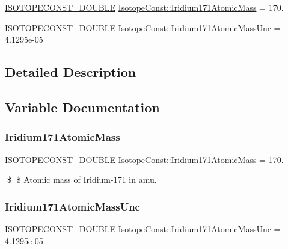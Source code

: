 \begin{DoxyCompactItemize}
\item 
\mbox{\hyperlink{group___isotope_const-_macros_ga8f45a7272ce02c0b4c65c44636ed719a}{I\+S\+O\+T\+O\+P\+E\+C\+O\+N\+S\+T\+\_\+\+D\+O\+U\+B\+LE}} \mbox{\hyperlink{group___isotope_const-_iridium-_ir171_ga6f3bc01a5c0d477dadae2682614b3708}{Isotope\+Const\+::\+Iridium171\+Atomic\+Mass}} = 170.
\item 
\mbox{\hyperlink{group___isotope_const-_macros_ga8f45a7272ce02c0b4c65c44636ed719a}{I\+S\+O\+T\+O\+P\+E\+C\+O\+N\+S\+T\+\_\+\+D\+O\+U\+B\+LE}} \mbox{\hyperlink{group___isotope_const-_iridium-_ir171_ga77c2593c188c1960186c204812b14785}{Isotope\+Const\+::\+Iridium171\+Atomic\+Mass\+Unc}} = 4.\+1295e-\/05
\end{DoxyCompactItemize}


\subsection{Detailed Description}


\subsection{Variable Documentation}
\mbox{\label{group___isotope_const-_iridium-_ir171_ga6f3bc01a5c0d477dadae2682614b3708}} 
\subsubsection{\texorpdfstring{Iridium171\+Atomic\+Mass}{Iridium171AtomicMass}}
{\footnotesize\ttfamily \mbox{\hyperlink{group___isotope_const-_macros_ga8f45a7272ce02c0b4c65c44636ed719a}{I\+S\+O\+T\+O\+P\+E\+C\+O\+N\+S\+T\+\_\+\+D\+O\+U\+B\+LE}} Isotope\+Const\+::\+Iridium171\+Atomic\+Mass = 170.}

\$ \$ Atomic mass of Iridium-\/171 in amu. \mbox{\label{group___isotope_const-_iridium-_ir171_ga77c2593c188c1960186c204812b14785}} 
\subsubsection{\texorpdfstring{Iridium171\+Atomic\+Mass\+Unc}{Iridium171AtomicMassUnc}}
{\footnotesize\ttfamily \mbox{\hyperlink{group___isotope_const-_macros_ga8f45a7272ce02c0b4c65c44636ed719a}{I\+S\+O\+T\+O\+P\+E\+C\+O\+N\+S\+T\+\_\+\+D\+O\+U\+B\+LE}} Isotope\+Const\+::\+Iridium171\+Atomic\+Mass\+Unc = 4.\+1295e-\/05}

